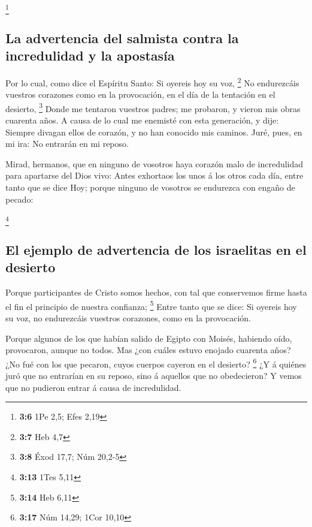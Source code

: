 \footnote{\textbf{3:6} 1Pe 2,5; Efes 2,19}

\hypertarget{la-advertencia-del-salmista-contra-la-incredulidad-y-la-apostasuxeda}{%
\subsection{La advertencia del salmista contra la incredulidad y la
apostasía}\label{la-advertencia-del-salmista-contra-la-incredulidad-y-la-apostasuxeda}}

 Por lo cual, como dice el Espíritu Santo: Si oyereis hoy
su voz, \footnote{\textbf{3:7} Heb 4,7}  No endurezcáis
vuestros corazones como en la provocación, en el día de la tentación en
el desierto, \footnote{\textbf{3:8} Éxod 17,7; Núm 20,2-5}
 Donde me tentaron vuestros padres; me probaron, y vieron
mis obras cuarenta años.  A causa de lo cual me enemisté
con esta generación, y dije: Siempre divagan ellos de corazón, y no han
conocido mis caminos.  Juré, pues, en mi ira: No entrarán
en mi reposo.

 Mirad, hermanos, que en ninguno de vosotros haya corazón
malo de incredulidad para apartarse del Dios vivo:  Antes
exhortaos los unos á los otros cada día, entre tanto que se dice Hoy;
porque ninguno de vosotros se endurezca con engaño de pecado:

\footnote{\textbf{3:13} 1Tes 5,11}

\hypertarget{el-ejemplo-de-advertencia-de-los-israelitas-en-el-desierto}{%
\subsection{El ejemplo de advertencia de los israelitas en el
desierto}\label{el-ejemplo-de-advertencia-de-los-israelitas-en-el-desierto}}

 Porque participantes de Cristo somos hechos, con tal que
conservemos firme hasta el fin el principio de nuestra confianza;
\footnote{\textbf{3:14} Heb 6,11}  Entre tanto que se
dice: Si oyereis hoy su voz, no endurezcáis vuestros corazones, como en
la provocación.

 Porque algunos de los que habían salido de Egipto con
Moisés, habiendo oído, provocaron, aunque no todos.  Mas
¿con cuáles estuvo enojado cuarenta años? ¿No fué con los que pecaron,
cuyos cuerpos cayeron en el desierto? \footnote{\textbf{3:17} Núm 14,29;
  1Cor 10,10}  ¿Y á quiénes juró que no entrarían en su
reposo, sino á aquellos que no obedecieron?  Y vemos que
no pudieron entrar á causa de incredulidad.

